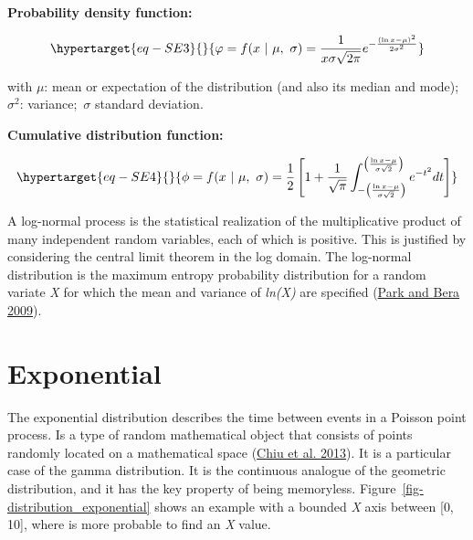\documentclass[
  letterpaper,
  DIV=11,
  numbers=noendperiod]{scrreprt}
\begin{document}
\textbf{Probability density function:}

\begin{equation}\protect\hypertarget{eq-SE3}{}{
\varphi = f(x\ |\ \mu,\ \sigma) = \frac{1}{x\sigma\sqrt{2\pi}}e^{- \frac{\left( \ln x - \mu \right)^{2}}{2\sigma^{2}}}
}\label{eq-SE3}\end{equation}

with \(\mu\): mean or expectation of the distribution (and also its
median and mode); \(\sigma^{2}\): variance;~\(\sigma\) standard
deviation.

\textbf{Cumulative distribution function:}

\begin{equation}\protect\hypertarget{eq-SE4}{}{
\phi = f(x\ |\ \mu,\ \sigma) = \frac{1}{2}\left\lbrack 1 + \frac{1}{\sqrt{\pi}}\int_{- \left( \frac{\ln x - \mu}{\sigma\sqrt{2}} \right)}^{\left( \frac{\ln x - \mu}{\sigma\sqrt{2}} \right)}e^{{- t}^{2}}dt \right\rbrack
}\label{eq-SE4}\end{equation}

A log-normal process is the statistical realization of the
multiplicative product of many independent random variables, each of
which is positive. This is justified by considering the central limit
theorem in the log domain. The log-normal distribution is the maximum
entropy probability distribution for a random variate \emph{X} for which
the mean and variance of \emph{ln(X)} are specified
(\protect\hyperlink{ref-park_maximum_2009}{Park and Bera 2009}).

\hypertarget{exponential}{%
\section{Exponential}\label{exponential}}

The exponential distribution describes the time between events in a
Poisson point process. Is a type of random mathematical object that
consists of points randomly located on a mathematical space
(\protect\hyperlink{ref-chiu_stochastic_2013}{Chiu et al. 2013}). It is
a particular case of the gamma distribution. It is the continuous
analogue of the geometric distribution, and it has the key property of
being memoryless. Figure~\ref{fig-distribution_exponential} shows an
example with a bounded \emph{X} axis between {[}0, 10{]}, where is more
probable to find an \emph{X} value.
\end{document}
